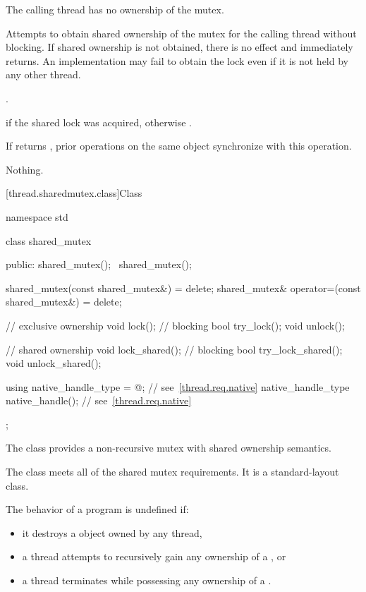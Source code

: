 \begin{itemdescr}
\pnum
\expects
The calling thread has no ownership of the mutex.

\pnum
\effects
Attempts to obtain shared ownership of the mutex for the calling
thread without blocking. If shared ownership is not obtained, there is no
effect and  immediately returns. An implementation
may fail to obtain the lock even if it is not held by any other thread.

\pnum
\returntype {}.

\pnum
\returns
{} if the shared lock was acquired, otherwise .

\pnum
\sync
If  returns , prior 
operations on the same object synchronize with this
operation.

\pnum
\throws
Nothing.
\end{itemdescr}

[thread.sharedmutex.class]{Class }

%
\begin{codeblock}
namespace std {
  class shared_mutex {
  public:
    shared_mutex();
    ~shared_mutex();

    shared_mutex(const shared_mutex&) = delete;
    shared_mutex& operator=(const shared_mutex&) = delete;

    // exclusive ownership
    void lock();                // blocking
    bool try_lock();
    void unlock();

    // shared ownership
    void lock_shared();         // blocking
    bool try_lock_shared();
    void unlock_shared();

    using native_handle_type = @\impdefnc@;          // see~\ref{thread.req.native}
    native_handle_type native_handle();                         // see~\ref{thread.req.native}
  };
}
\end{codeblock}

\pnum
The class  provides a non-recursive mutex
with shared ownership semantics.

\pnum
The class  meets
all of the shared mutex requirements.
It is a standard-layout class.

\pnum
The behavior of a program is undefined if:
\begin{itemize}
\item it destroys a  object owned by any thread,
\item a thread attempts to recursively gain any ownership of a , or
\item a thread terminates while possessing any ownership of a .
\end{itemize}

